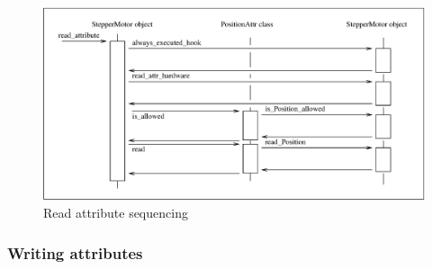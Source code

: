 \begin{figure}[H]
\begin{centering}
\includegraphics[scale=0.7]{ds_writing/r_attribute}
\par\end{centering}
\caption{Read attribute sequencing\label{r_attribute_timing_fig}}
\end{figure}


\subsubsection{Writing attributes}

